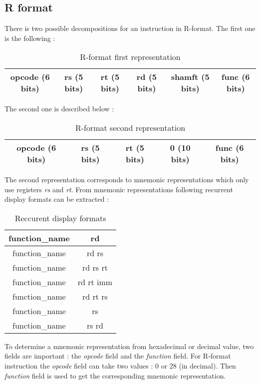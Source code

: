 \subsection*{R format}

	There is two possible decompositions for an instruction in R-format. The first one is the following : 
	
	\begin{table}[H]
	\centering
		\begin{tabular}{|c|c|c|c|c|c|}
			\hline 
	opcode (6 bits) & rs (5 bits) & rt (5 bits) & rd (5 bits) & shamft (5 bits) & func (6 bits) \\ 
			\hline 
		\end{tabular} 
		\caption{R-format first representation}
	\end{table}
	
	The second one is described below :
	\begin{table}[H]
		\centering
		\begin{tabular}{|c|c|c|c|c|}
			\hline 
	opcode (6 bits) & rs (5 bits) & rt (5 bits) & 0 (10 bits) & func (6 bits) \\ 
			\hline 
		\end{tabular} 
		\caption{R-format second representation}
	\end{table}
	
	The second representation corresponds to mnemonic representations which only use registers \textit{rs} and \textit{rt}. From mnemonic representations following recurrent display formats can be extracted :
	
	\begin{table}[H]
	\centering
	\begin{tabular}{|c|c|}
	\hline 
	function\_name & rd \\ 
	\hline 
	function\_name & rd rs \\ 
	\hline 
	function\_name & rd rs rt \\ 
	\hline 
	function\_name & rd rt imm \\ 
	\hline 
	function\_name & rd rt rs \\ 
	\hline 
	function\_name & rs \\ 
	\hline 
	function\_name & rs rd \\ 
	\hline 
	\end{tabular}
	\caption{Reccurent display formats}
	\end{table}
	
	To determine a mnemonic representation from hexadecimal or decimal value, two fields are important : the \textit{opcode} field and the \textit{function} field. For R-format instruction the \textit{opcode} field can take two values : 0 or 28 (in decimal). Then \textit{function} field is used to get the corresponding mnemonic representation.
